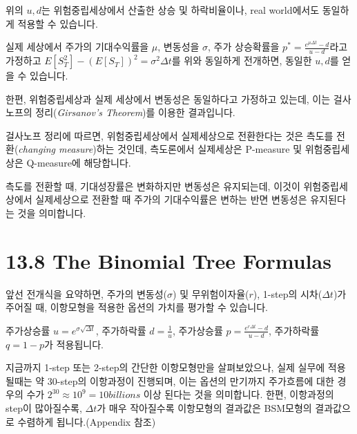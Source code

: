 \documentclass[
  letterpaper,
  DIV=11,
  numbers=noendperiod]{scrreprt}
\begin{document}
\begin{tcolorbox}[enhanced jigsaw, titlerule=0mm, bottomtitle=1mm, left=2mm, title=\textcolor{quarto-callout-important-color}{\faExclamation}\hspace{0.5em}{In Real-world u\&d}, toptitle=1mm, bottomrule=.15mm, colframe=quarto-callout-important-color-frame, breakable, opacityback=0, rightrule=.15mm, opacitybacktitle=0.6, coltitle=black, colback=white, arc=.35mm, colbacktitle=quarto-callout-important-color!10!white, toprule=.15mm, leftrule=.75mm]

위의 \(u,d\)는 위험중립세상에서 산출한 상승 및 하락비율이나, real
world에서도 동일하게 적용할 수 있습니다.

실제 세상에서 주가의 기대수익률을 \(\mu\), 변동성을 \(\sigma\), 주가
상승확률을 \(p^*=\frac{e^{\mu\Delta t}-d}{u-d}\)라고 가정하고
\(E[S_T^2]-(E[S_T])^2=\sigma^2\Delta t\)를 위와 동일하게 전개하면,
동일한 \(u,d\)를 얻을 수 있습니다.

한편, 위험중립세상과 실제 세상에서 변동성은 동일하다고 가정하고 있는데,
이는 걸사노프의 정리(\emph{Girsanov's Theorem})를 이용한 결과입니다.

걸사노프 정리에 따르면, 위험중립세상에서 실제세상으로 전환한다는 것은
측도를 전환(\emph{changing measure})하는 것인데, 측도론에서 실제세상은
P-measure 및 위험중립세상은 Q-measure에 해당합니다.

측도를 전환할 때, 기대성장률은 변화하지만 변동성은 유지되는데, 이것이
위험중립세상에서 실제세상으로 전환할 때 주가의 기대수익률은 변하는 반면
변동성은 유지된다는 것을 의미합니다.

\end{tcolorbox}

\section*{13.8 The Binomial Tree
Formulas}\label{the-binomial-tree-formulas}


앞선 전개식을 요약하면, 주가의 변동성(\(\sigma\)) 및
무위험이자율(\(r\)), 1-step의 시차(\(\Delta t\))가 주어질 때, 이항모형을
적용한 옵션의 가치를 평가할 수 있습니다.

주가상승률 \(u=e^{\sigma\sqrt{\Delta t}}\), 주가하락률
\(d=\frac{1}{u}\), 주가상승률 \(p=\frac{e^{r\Delta t}-d}{u-d}\),
주가하락률 \(q=1-p\)가 적용됩니다.

지금까지 1-step 또는 2-step의 간단한 이항모형만을 살펴보았으나, 실제
실무에 적용될때는 약 30-step의 이항과정이 진행되며, 이는 옵션의 만기까지
주가흐름에 대한 경우의 수가 \(2^{30}\approx 10^9=10billions\) 이상
된다는 것을 의미합니다. 한편, 이항과정의 step이 많아질수록,
\(\Delta t\)가 매우 작아질수록 이항모형의 결과값은 BSM모형의 결과값으로
수렴하게 됩니다.(Appendix 참조)
\end{document}
